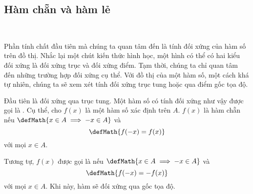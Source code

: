 \subsection{Hàm chẵn và hàm lẻ}

\ %

Phần tính chất đầu tiên mà chúng ta quan tâm đến là tính đối xứng của hàm số trên đồ thị. Nhắc lại một chút kiến thức hình học, một hình có thể có hai kiểu đối xứng là đối xứng trục và đối xứng điểm. Tạm thời, chúng ta chỉ quan tâm đến những trường hợp đối xứng cụ thể. Với đồ thị của một hàm số, một cách khá tự nhiên, chúng ta sẽ xem xét tính đối xứng trục tung hoặc qua điểm gốc tọa độ. 

Đầu tiên là đối xứng qua trục tung. Một hàm số có tính đối xứng như vậy được gọi là . Cụ thể, cho $f(x)$ là một hàm số xác định trên $A$. $f(x)$ là hàm chẵn nếu $\defMath{x \in A \implies -x \in A}$ và $$\defMath{f(-x) = f(x)}$$ với mọi $x \in A$. 

Tương tự, $f(x)$ được gọi là  nếu $\defMath{x \in A \implies -x \in A}$ và $$\defMath{f(-x) = -f(x)}$$ với mọi $x \in A$. Khi này, hàm sẽ đối xứng qua gốc tọa độ.

